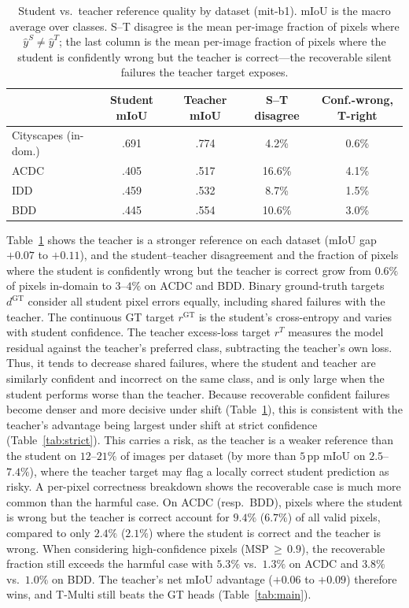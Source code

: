 \documentclass{article}
\begin{document}
\begin{table}[H]
\centering
\small
\setlength{\tabcolsep}{5pt}
\caption{Student vs.\ teacher reference quality by dataset (mit-b1). mIoU is the macro average over classes. S--T disagree is the mean per-image fraction of pixels where $\hat y^S\!\neq\!\hat y^T$; the last column is the mean per-image fraction of pixels where the student is confidently wrong but the teacher is correct---the recoverable silent failures the teacher target exposes.}
\label{tab:diag}
\begin{tabular}{lcccc}
\toprule
 & Student mIoU & Teacher mIoU & S--T disagree & Conf.-wrong, T-right \\
\midrule
Cityscapes (in-dom.) & .691 & .774 & 4.2\% & 0.6\% \\
ACDC & .405 & .517 & 16.6\% & 4.1\% \\
IDD & .459 & .532 & 8.7\% & 1.5\% \\
BDD & .445 & .554 & 10.6\% & 3.0\% \\
\bottomrule
\end{tabular}
\end{table}

Table~\ref{tab:diag} shows the teacher is a stronger reference on each dataset (mIoU gap $+0.07$ to $+0.11$), and the student--teacher disagreement and the fraction of pixels where the student is confidently wrong but the teacher is correct grow from $0.6\%$ of pixels in-domain to $3$--$4\%$ on ACDC and BDD. Binary ground-truth targets $d^{\mathrm{GT}}$ consider all student pixel errors equally, including shared failures with the teacher. The continuous GT target $r^{\mathrm{GT}}$ is the student's cross-entropy and varies with student confidence. The teacher excess-loss target $r^{T}$ measures the model residual against the teacher's preferred class, subtracting the teacher's own loss. Thus, it tends to decrease shared failures, where the student and teacher are similarly confident and incorrect on the same class, and is only large when the student performs worse than the teacher. Because recoverable confident failures become denser and more decisive under shift (Table~\ref{tab:diag}), this is consistent with the teacher's advantage being largest under shift at strict confidence (Table~\ref{tab:strict}). This carries a risk, as the teacher is a weaker reference than the student on $12$--$21\%$ of images per dataset (by more than $5$\,pp mIoU on $2.5$--$7.4\%$), where the teacher target may flag a locally correct student prediction as risky. A per-pixel correctness breakdown shows the recoverable case is much more common than the harmful case. On ACDC (resp.\ BDD), pixels where the student is wrong but the teacher is correct account for $9.4\%$ ($6.7\%$) of all valid pixels, compared to only $2.4\%$ ($2.1\%$) where the student is correct and the teacher is wrong. When considering high-confidence pixels (MSP$\,{\geq}\,0.9$), the recoverable fraction still exceeds the harmful case with $5.3\%$ vs.\ $1.3\%$ on ACDC and $3.8\%$ vs.\ $1.0\%$ on BDD. The teacher's net mIoU advantage ($+0.06$ to $+0.09$) therefore wins, and T-Multi still beats the GT heads (Table~\ref{tab:main}).
\end{document}
